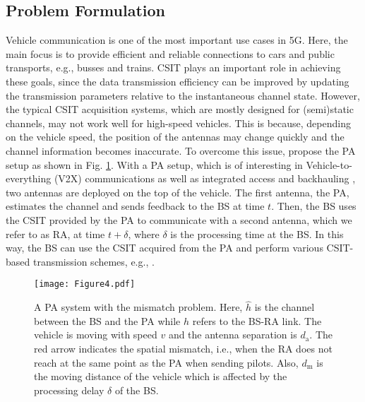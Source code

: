 \subsection{Problem Formulation}
Vehicle communication is one of the most important use cases in 5G.  Here, the main focus is to provide efficient and reliable connections to cars and public transports, e.g., busses and trains. CSIT plays an important role in achieving these goals, since the data transmission efficiency can be improved by updating the transmission parameters relative to the instantaneous channel state.  However, the typical CSIT acquisition systems, which are mostly designed for (semi)static channels, may not work well for high-speed vehicles. This is because, depending on the vehicle speed, the position of the antennas may change quickly and the channel information becomes inaccurate.  To overcome this issue, \cite{Sternad2012WCNCWusing,DT2015ITSMmaking,BJ2017PIMRCpredictor,phan2018WSAadaptive,Jamaly2014EuCAPanalysis, BJ2017ICCWusing} propose the PA setup as shown in Fig. \ref{system}. With a PA setup, which is of interesting in Vehicle-to-everything (V2X) communications \cite{Sternad2012WCNCWusing} as well as integrated access and backhauling \cite{Teyeb2019VTCintegrated}, two antennas are deployed on the top of the vehicle. The first antenna,  the PA,  estimates the channel and sends feedback to the BS at time $t$. Then, the BS uses the CSIT provided by the PA to communicate with a second antenna, which we refer to as RA, at time $t+\delta$, where $\delta$ is the processing time at the BS. In this way, the BS can use the CSIT acquired from the PA and perform various CSIT-based transmission schemes, e.g.,  \cite{Sternad2012WCNCWusing,BJ2017ICCWusing}.  


\begin{figure}
\centering
  \texttt{[image: Figure4.pdf]}\\
\caption{A PA system with the mismatch problem. Here, $\hat h$ is the channel between the BS and the PA while $h$ refers to the BS-RA link. The vehicle is moving with speed $v$ and the antenna separation is $d_\text{a}$. The red arrow indicates the spatial mismatch, i.e., when the RA does not reach at the same  point as the PA when sending pilots. Also, $d_\text{m}$ is the moving distance of the vehicle which is affected by the processing delay $\delta$ of the BS. }\label{system}
\end{figure}


